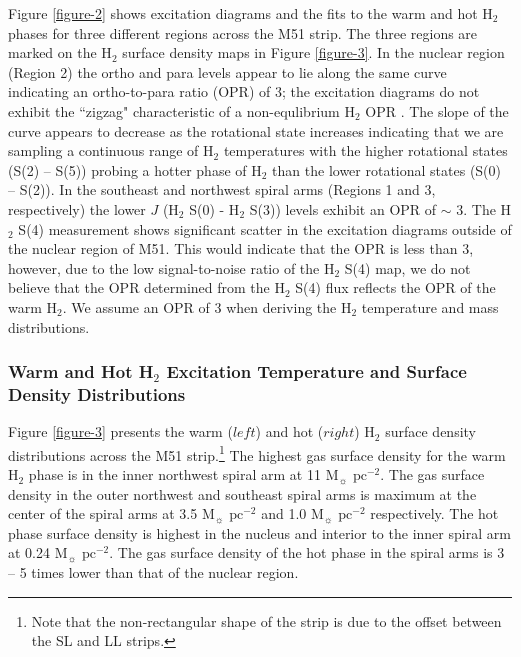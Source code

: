 \documentclass[manuscript]{aastex}
\begin{document}
Figure \ref{figure-2} shows excitation diagrams and the 
fits to the warm and hot H$_2$ phases for three
different regions across the M51 strip.  The three 
regions are marked on the H$_2$ surface density 
maps in Figure \ref{figure-3}.  In the nuclear region 
(Region 2) the ortho and para levels appear to lie along the 
same curve indicating an ortho-to-para ratio (OPR) of 3; 
the excitation diagrams do not exhibit the ``zigzag" characteristic of a 
non-equlibrium H$_2$ OPR \citep{neu98, fue99}.  The 
slope of the curve appears to decrease as the rotational 
state increases indicating that we are sampling a continuous 
range of H$_2$ temperatures with the higher rotational 
states (S(2) -- S(5)) probing a hotter phase of H$_2$ 
than the lower rotational states (S(0) -- S(2)).  In the 
southeast and northwest spiral arms (Regions 1 and 
3, respectively) the lower $J$ (H$_2$ S(0) - 
H$_2$ S(3)) levels exhibit an OPR of $\sim$ 3.  The 
H$_2$ S(4) measurement shows significant 
scatter in the excitation diagrams outside of the nuclear 
region of M51.  This would indicate that the OPR is 
less than 3, however, due to the low signal-to-noise 
ratio of the H$_2$ S(4) map, we do not 
believe that the OPR determined from the H$_2$ 
S(4) flux reflects the OPR of the warm H$_2$. 
We assume an OPR of 3 when deriving the H$_2$ 
temperature and mass distributions.

\subsubsection{Warm and Hot H$_2$ Excitation Temperature and Surface Density Distributions}

Figure \ref{figure-3} presents the warm ($left$) and hot ($right$)
$\mathrm{H_2}$ surface density distributions across the M51 
strip.\footnote{Note that the non-rectangular shape of the strip 
is due to the offset between the SL and LL strips.}  The highest 
gas surface density for the warm $\mathrm{H_2}$ phase is in 
the inner northwest spiral arm at 11 $\mathrm{M_\sun}$ 
$\mathrm{pc^{-2}}$. The gas surface density in the outer 
northwest and southeast spiral arms is maximum at the 
center of the spiral arms at 3.5 $\mathrm{M_\sun}$ 
$\mathrm{pc^{-2}}$ and 1.0 $\mathrm{M_\sun}$ $\mathrm{pc^{-2}}$ 
respectively.  The hot phase surface density is highest in 
the nucleus and interior to the inner spiral arm at 0.24 
$\mathrm{M_\sun}$ $\mathrm{pc^{-2}}$.  The gas surface 
density of the hot phase in the spiral arms is 3 -- 5 times 
lower than that of the nuclear region.
\end{document}
